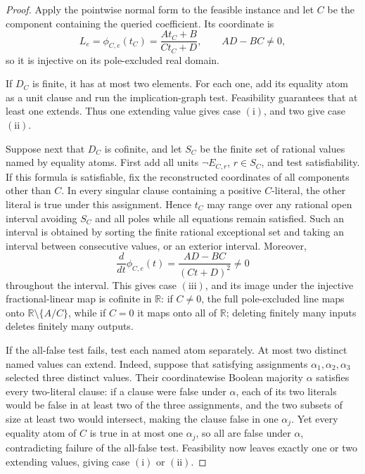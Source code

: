 \documentclass{article}
\begin{document}
\begin{proof}
Apply the pointwise normal form to the feasible instance and let \(C\) be the component containing the queried coefficient.  Its coordinate is
\[
L_e=\phi_{C,e}(t_C)=\frac{A t_C+B}{C t_C+D},
\qquad AD-BC\ne0,
\]
so it is injective on its pole-excluded real domain.

If \(D_C\) is finite, it has at most two elements.  For each one, add its equality atom as a unit clause and run the implication-graph test.  Feasibility guarantees that at least one extends.  Thus one extending value gives case \(\mathrm{(i)}\), and two give case \(\mathrm{(ii)}\).

Suppose next that \(D_C\) is cofinite, and let \(S_C\) be the finite set of rational values named by equality atoms.  First add all units \(\neg E_{C,r}\), \(r\in S_C\), and test satisfiability.  If this formula is satisfiable, fix the reconstructed coordinates of all components other than \(C\).  In every singular clause containing a positive \(C\)-literal, the other literal is true under this assignment.  Hence \(t_C\) may range over any rational open interval avoiding \(S_C\) and all poles while all equations remain satisfied.  Such an interval is obtained by sorting the finite rational exceptional set and taking an interval between consecutive values, or an exterior interval.  Moreover,
\[
\frac{d}{dt}\phi_{C,e}(t)=\frac{AD-BC}{(Ct+D)^2}\ne0
\]
throughout the interval.  This gives case \(\mathrm{(iii)}\), and its image under the injective fractional-linear map is cofinite in \(\mathbb R\): if \(C\ne0\), the full pole-excluded line maps onto \(\mathbb R\setminus\{A/C\}\), while if \(C=0\) it maps onto all of \(\mathbb R\); deleting finitely many inputs deletes finitely many outputs.

If the all-false test fails, test each named atom separately.  At most two distinct named values can extend.  Indeed, suppose that satisfying assignments \(\alpha_1,\alpha_2,\alpha_3\) selected three distinct values.  Their coordinatewise Boolean majority \(\alpha\) satisfies every two-literal clause: if a clause were false under \(\alpha\), each of its two literals would be false in at least two of the three assignments, and the two subsets of size at least two would intersect, making the clause false in one \(\alpha_j\).  Yet every equality atom of \(C\) is true in at most one \(\alpha_j\), so all are false under \(\alpha\), contradicting failure of the all-false test.  Feasibility now leaves exactly one or two extending values, giving case \(\mathrm{(i)}\) or \(\mathrm{(ii)}\).


\end{proof}
\end{document}
